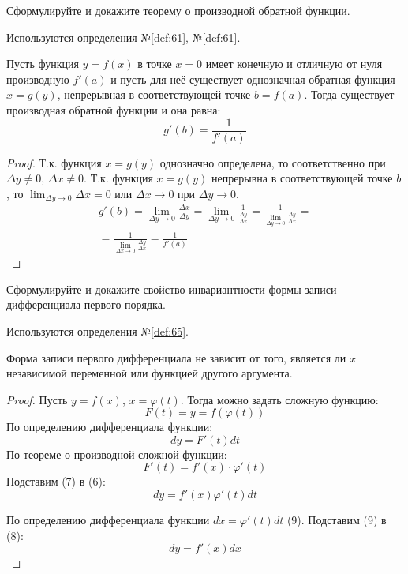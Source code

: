 \begin{question}
    Сформулируйте и докажите теорему о производной обратной функции.
\end{question}
\begin{used}
    Используются определения №\ref{def:61}, №\ref{def:61}.
\end{used}
\begin{theorem}
    Пусть функция $y = f(x)$ в точке $x = 0$ имеет конечную и отличную от нуля производную  $f'(a)$ и пусть для неё существует однозначная обратная функция $x = g(y)$, непрерывная в соответствующей точке $b = f(a)$.
    Тогда существует производная обратной функции и она равна:  \[
        g'(b) = \frac{1}{f'(a)}
    \] 
\end{theorem}
\begin{proof}
    Т.к. функция $x = g(y)$ однозначно определена, то соответственно при  $\Delta y \neq 0$, $\Delta x \neq 0$.
    Т.к. функция $x = g(y)$ непрерывна в соответствующей точке $b$, то  $\lim_{\Delta y \to 0} \Delta x = 0$ или $\Delta x \to 0$ при $\Delta y \to 0$.
    \begin{gather*}
        g'(b) = \lim_{\Delta y \to 0} \frac{\Delta x}{\Delta y} = \lim_{\Delta y \to 0} \frac{1}{\frac{\Delta y}{\Delta x}} = \frac{1}{\lim_{\Delta y \to 0} \frac{\Delta y}{\Delta x}} = \\
        = \frac{1}{\lim_{\Delta x \to 0} \frac{\Delta y}{\Delta x}} = \frac{1}{f'(a)}
    \end{gather*}
\end{proof}
\pagebreak



\begin{question}
    Сформулируйте и докажите свойство инвариантности формы записи дифференциала первого порядка.
\end{question}
\begin{used}
    Используются определения №\ref{def:65}.
\end{used}
\begin{theorem}
    Форма записи первого дифференциала не зависит от того, является ли $x$ независимой переменной или функцией другого аргумента.
\end{theorem}
\begin{proof}
    Пусть $y = f(x)$,  $x = \varphi(t)$. Тогда можно задать сложную функцию: \[
        F(t) = y = f(\varphi(t))
    \] 
    По определению дифференциала функции: \[
        dy = F'(t)dt \tag{6}
    \] 
    По теореме о производной сложной функции: \[
        F'(t) = f'(x) \cdot \varphi'(t) \tag{7}
    \] 
    Подставим (7) в (6): \[
        dy = f'(x) \varphi'(t) dt \tag{8} 
    \] 

    По определению дифференциала функции $dx = \varphi'(t)dt$ \quad (9).
    Подставим (9) в (8): \[
        \boxed{dy = f'(x) dx}
    \] 
\end{proof}
\pagebreak



